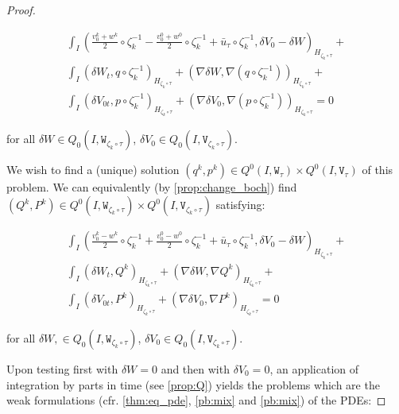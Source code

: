 \documentclass[english,a4paper,9pt,oneside]{scrbook}	%
\theoremstyle{break}
\newenvironment{mproof}[1][\proofname]{%
  \begin{proof}[#1]$ $\par\nobreak\ignorespaces
}{%
  \end{proof}
}
\renewcommand*{\proofname}{Proof}
\theoremstyle{remark}
\newcommand{\tw}[1]{\texttt{#1}}
\begin{document}
\begin{mproof}
\begin{align*}
\int_I \left (\frac{v_0^k+w^k}{2}\circ \zeta_k^{-1}- \frac{v_0^0+w^0}{2}\circ \zeta_k^{-1}+\bar{u}_\tau\circ \zeta_k^{-1} ,\delta V_0-\delta W\right)_{H_{\zeta_k \circ \tau}}+\\
\int_I ( \delta W_t , q\circ \zeta_k^{-1})_{H_{\zeta_k \circ \tau}}+ (\nabla\delta W, \nabla( q\circ \zeta_k^{-1}))_{H_{\zeta_k \circ \tau}}+\\
\int_I ( \delta V_{0t},p \circ \zeta_k^{-1})_{H_{\zeta_k \circ \tau}} + ( \nabla \delta V_0, \nabla (p\circ \zeta_k^{-1}))_{H_{\zeta_k \circ \tau}} = 0
\end{align*}

for all $\delta W \in Q_0(I, \tw{W}_{\zeta_k \circ \tau})$, $ \delta V_{0} \in Q_0(I,\tw{V}_{\zeta_k \circ \tau})$.

We wish to find a (unique) solution $(q^k, p^k) \in Q^0(I, \tw{W}_\tau)\times Q^0(I, \tw{V}_\tau)$ of this problem. We can equivalently (by \cref{prop:change_boch}) find $(Q^k, P^k) \in Q^0(I, \tw{W}_{\zeta_k \circ \tau})\times Q^0(I, \tw{V}_{\zeta_k \circ \tau})$ satisfying:

\begin{align*}
\int_I \left (\frac{v_0^k-w^k}{2}\circ \zeta_k^{-1}+ \frac{v_0^0-w^0}{2}\circ \zeta_k^{-1}+\bar{u}_\tau\circ \zeta_k^{-1} ,\delta V_0-\delta W\right)_{H_{\zeta_k \circ \tau}}+\\
\int_I (\delta W_t ,Q^k )_{H_{\zeta_k \circ \tau}}+ (\nabla \delta W, \nabla Q^k)_{H_{\zeta_k \circ \tau}}+\\
\int_I( \delta V_{0t},P^k)_{H_{\zeta_k \circ \tau}} + ( \nabla \delta V_0, \nabla P^k)_{H_{\zeta_k \circ \tau}} = 0
\end{align*}

for all $\delta W, \in Q_0(I, \tw{W}_{\zeta_k \circ \tau})$, $ \delta V_{0} \in Q_0(I,\tw{V}_{\zeta_k \circ \tau})$.

Upon testing first with $\delta W=0$ and then with $\delta V_0=0$, an application of integration by parts in time (see \cref{prop:Q}) yields the problems which are the weak formulations (cfr. \cref{thm:eq_pde}, \cref{pb:mix} and \cref{pb:mix}) of the PDEs:


\end{mproof}
\end{document}
